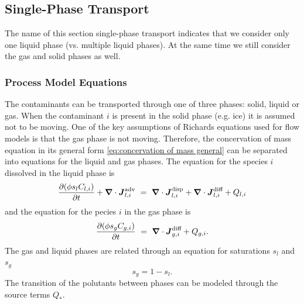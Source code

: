\subsection{Single-Phase Transport} 
\label{sec:transport-single-phase}

The name of this section single-phase transport indicates that we consider only one liquid phase 
(vs. multiple liquid phases).
At the same time we still consider the gas and solid phases as well.

\subsubsection{Process Model Equations} 

The contaminants can be transported through one of three phases:
solid, liquid or gas.
When the contaminant $i$ is present in the solid phase (e.g. ice)
it is assumed not to be moving.
One of the key assumptions of Richards equations used for flow models 
is that the gas phase is not moving.  
Therefore, the concervation of mass equation in its general form 
\eqref{eq:concervation of mass general}
can be separated into equations
for the liquid and gas phases.
The equation for the species $i$ dissolved in the liquid phase is
\begin{equation}  \label{eq:MassConservation}
  \frac{\partial ( \phi s_l C_{l,i} )}{\partial t } + {\boldsymbol{\nabla}} \cdot {\boldsymbol{J}}_{l,i}^\text{adv} 
  \ =\  
  {\boldsymbol{\nabla}} \cdot {\boldsymbol{J}}_{l,i}^\text{disp} + {\boldsymbol{\nabla}} \cdot {\boldsymbol{J}}_{l,i}^\text{diff} + Q_{l,i}
\end{equation}
and the equation for the pecies $i$ in the gas phase is
\begin{equation}  \label{eq:MassConservation gas}
  \frac{\partial ( \phi s_g C_{g,i} )}{\partial t } 
  \ =\  
  {\boldsymbol{\nabla}} \cdot {\boldsymbol{J}}_{g,i}^\text{diff} + Q_{g,i}.
\end{equation}
The gas and liquid phases are related through an equation for saturations $s_l$ and $s_g$
$$
  s_g = 1-s_l.
$$
The transition of the polutants between phases can be modeled through the source terms $Q_*$. 



